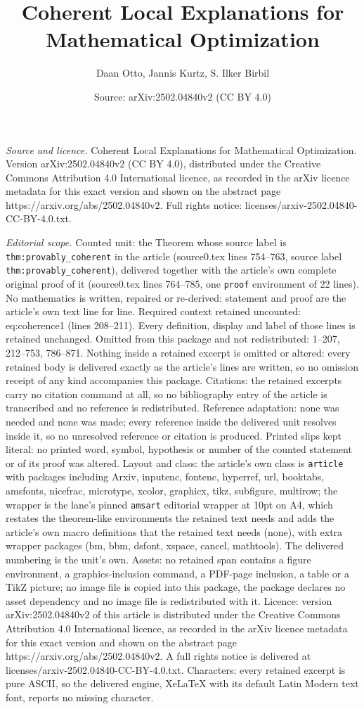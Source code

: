 \documentclass[10pt,a4paper]{amsart}
\title[Coherent Local Explanations for Mathematical Optimization]{Coherent Local Explanations for Mathematical Optimization}
\author{Daan Otto, Jannis Kurtz, S. Ilker Birbil}
\date{Source: arXiv:2502.04840v2 (CC BY 4.0)}
\begin{document}
\maketitle

\noindent\emph{Source and licence.} Coherent Local Explanations for Mathematical Optimization. Version arXiv:2502.04840v2 (CC BY 4.0), distributed under the Creative Commons Attribution 4.0 International licence, as recorded in the arXiv licence metadata for this exact version and shown on the abstract page https://arxiv.org/abs/2502.04840v2. Full rights notice: licenses/arxiv-2502.04840-CC-BY-4.0.txt.\par\smallskip

\noindent\textit{Editorial scope.} Counted unit: the Theorem whose source label is \texttt{thm:provably\_coherent} in the article (source0.tex lines 754--763, source label \texttt{thm:provably\_coherent}), delivered together with the article's own complete original proof of it (source0.tex lines 764--785, one \texttt{proof} environment of 22 lines). No mathematics is written, repaired or re-derived: statement and proof are the article's own text line for line. Required context retained uncounted: eq:coherence1 (lines 208--211). Every definition, display and label of those lines is retained unchanged. Omitted from this package and not redistributed: 1--207, 212--753, 786--871. Nothing inside a retained excerpt is omitted or altered: every retained body is delivered exactly as the article's lines are written, so no omission receipt of any kind accompanies this package. Citations: the retained excerpts carry no citation command at all, so no bibliography entry of the article is transcribed and no reference is redistributed. Reference adaptation: none was needed and none was made; every reference inside the delivered unit resolves inside it, so no unresolved reference or citation is produced. Printed slips kept literal: no printed word, symbol, hypothesis or number of the counted statement or of its proof was altered. Layout and class: the article's own class is \texttt{article} with packages including Arxiv, inputenc, fontenc, hyperref, url, booktabs, amsfonts, nicefrac, microtype, xcolor, graphicx, tikz, subfigure, multirow; the wrapper is the lane's pinned \texttt{amsart} editorial wrapper at 10pt on A4, which restates the theorem-like environments the retained text needs and adds the article's own macro definitions that the retained text needs (none), with extra wrapper packages (bm, bbm, dsfont, xspace, cancel, mathtools). The delivered numbering is the unit's own. Assets: no retained span contains a figure environment, a graphics-inclusion command, a PDF-page inclusion, a table or a TikZ picture; no image file is copied into this package, the package declares no asset dependency and no image file is redistributed with it. Licence: version arXiv:2502.04840v2 of this article is distributed under the Creative Commons Attribution 4.0 International licence, as recorded in the arXiv licence metadata for this exact version and shown on the abstract page https://arxiv.org/abs/2502.04840v2. A full rights notice is delivered at licenses/arxiv-2502.04840-CC-BY-4.0.txt. Characters: every retained excerpt is pure ASCII, so the delivered engine, XeLaTeX with its default Latin Modern text font, reports no missing character.
\end{document}
